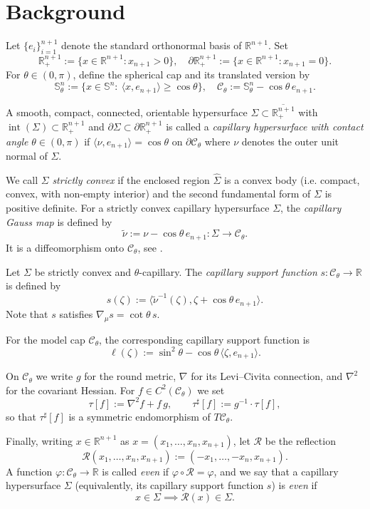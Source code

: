 \documentclass[12pt]{amsart}
\numberwithin{equation}{section}
\newcommand{\ti}{\tilde}
\newcommand{\ov}{\overline}
\newcommand{\bbR}{\mathbb{R}}
\newcommand{\bbS}{\mathbb{S}}
\newcommand{\Sn}{\mathbb{S}^n}
\newcommand{\op}[1]{\operatorname{#1}}
\newcommand{\8}{\infty}
\newcommand{\Si}{\Sigma}
\newcommand{\cC}{\mathcal{C}}
\newcommand{\cR}{\mathcal{R}}
\newcommand{\del}{\partial}
\newcommand{\ip}[2]{\langle #1,#2 \rangle}
\newcommand{\Cth}{\cC_\theta}
\begin{document}
\section{Background}
Let $\{e_i\}_{i=1}^{n+1}$ denote the standard orthonormal basis of $\bbR^{n+1}$. Set
\[
\bbR^{n+1}_+ := \{x\in\bbR^{n+1}: x_{n+1}>0\},
\quad
\del\bbR^{n+1}_+ := \{x\in\bbR^{n+1}: x_{n+1}=0\}.
\]
For $\theta\in(0,\pi)$, define the spherical cap and its translated version by
\[
\bbS^n_\theta := \{x\in\Sn:\ \ip{x}{e_{n+1}}\ge \cos\theta\},
\quad
\cC_\theta := \bbS^n_\theta-\cos\theta\,e_{n+1}.
\]

A smooth, compact, connected, orientable hypersurface
$\Si\subset\ov{\bbR^{n+1}_+}$ with $\op{int}(\Si)\subset\bbR^{n+1}_+$ and
$\del\Si\subset\del\bbR^{n+1}_+$ is called a \emph{capillary hypersurface with contact angle}
$\theta\in(0,\pi)$ if
$
\ip{\nu}{e_{n+1}}=\cos\theta
$
 on $\partial \Cth$ where $\nu$ denotes the outer unit normal of $\Si$.
 
We call $\Si$ \emph{strictly convex} if the enclosed region $\widehat\Si$ is a convex body (i.e. compact, convex, with non-empty interior) and the second fundamental form of $\Si$ is positive definite. For a strictly convex capillary hypersurface $\Si$, the \emph{capillary Gauss map} is defined by
\[
\ti\nu := \nu-\cos\theta\,e_{n+1}:\Si\to \cC_\theta.
\]
It is a diffeomorphism onto $\cC_\theta$, see \cite[Lem. 2.2]{MWWX25e}.

Let $\Si$ be strictly convex and $\theta$-capillary. The \emph{capillary support function} $s:\cC_\theta\to\bbR$ is defined by
\[
s(\zeta):=\ip{\ti\nu^{-1}(\zeta)}{\zeta+\cos\theta\,e_{n+1}}.
\]
Note that $s$ satisfies
$
\nabla_{\mu}s=\cot\theta \, s.
$

For the model cap $\cC_\theta$, the corresponding capillary support function is
\[
\ell(\zeta):=\sin^2\theta-\cos\theta\,\ip{\zeta}{e_{n+1}}.
\]


On $\cC_\theta$ we write $g$ for the round metric, $\nabla$ for its Levi--Civita connection, and
$\nabla^2$ for the covariant Hessian. For $f\in C^2(\cC_\theta)$ we set
\[
\tau[f]:=\nabla^2 f+f\,g,
\qquad
\tau^\sharp[f]:=g^{-1}\cdot\tau[f],
\]
so that $\tau^\sharp[f]$ is a symmetric endomorphism of $T\cC_\theta$.

Finally, writing $x\in\bbR^{n+1}$ as $x=(x_1,\dots,x_n,x_{n+1})$, let $\cR$ be the reflection
\[
\cR(x_1,\dots,x_n,x_{n+1}):=(-x_1,\dots,-x_n,x_{n+1}).
\]
A function $\varphi:\cC_\theta\to\bbR$ is called \emph{even} if $\varphi\circ\cR=\varphi$, and we
say that a capillary hypersurface $\Si$ (equivalently, its capillary support function $s$) is
\emph{even} if
\[
x\in\Si  \implies \cR(x)\in\Si.
\]
\end{document}
